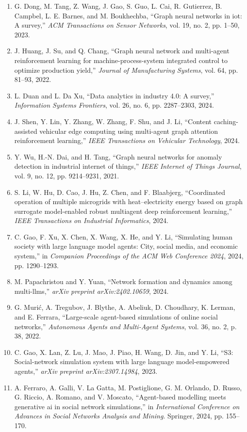 \documentclass[10pt,UTF8,fontset=fandol]{ctexart}
\begin{document}
\begin{enumerate}[leftmargin=2.4em,labelsep=0.4em,itemsep=0.15em]
\item G. Dong, M. Tang, Z. Wang, J. Gao, S. Guo, L. Cai, R. Gutierrez, B. Campbel, L. E. Barnes, and M. Boukhechba, ``Graph neural networks in iot: A survey,'' \textit{ACM Transactions on Sensor Networks}, vol. 19, no. 2, pp. 1--50, 2023.
\item J. Huang, J. Su, and Q. Chang, ``Graph neural network and multi-agent reinforcement learning for machine-process-system integrated control to optimize production yield,'' \textit{Journal of Manufacturing Systems}, vol. 64, pp. 81--93, 2022.
\item L. Duan and L. Da Xu, ``Data analytics in industry 4.0: A survey,'' \textit{Information Systems Frontiers}, vol. 26, no. 6, pp. 2287--2303, 2024.
\item J. Shen, Y. Lin, Y. Zhang, W. Zhang, F. Shu, and J. Li, ``Content caching-assisted vehicular edge computing using multi-agent graph attention reinforcement learning,'' \textit{IEEE Transactions on Vehicular Technology}, 2024.
\item Y. Wu, H.-N. Dai, and H. Tang, ``Graph neural networks for anomaly detection in industrial internet of things,'' \textit{IEEE Internet of Things Journal}, vol. 9, no. 12, pp. 9214--9231, 2021.
\item S. Li, W. Hu, D. Cao, J. Hu, Z. Chen, and F. Blaabjerg, ``Coordinated operation of multiple microgrids with heat--electricity energy based on graph surrogate model-enabled robust multiagent deep reinforcement learning,'' \textit{IEEE Transactions on Industrial Informatics}, 2024.
\item C. Gao, F. Xu, X. Chen, X. Wang, X. He, and Y. Li, ``Simulating human society with large language model agents: City, social media, and economic system,'' in \textit{Companion Proceedings of the ACM Web Conference 2024}, 2024, pp. 1290--1293.
\item M. Papachristou and Y. Yuan, ``Network formation and dynamics among multi-llms,'' \textit{arXiv preprint arXiv:2402.10659}, 2024.
\item G. Murić, A. Tregubov, J. Blythe, A. Abeliuk, D. Choudhary, K. Lerman, and E. Ferrara, ``Large-scale agent-based simulations of online social networks,'' \textit{Autonomous Agents and Multi-Agent Systems}, vol. 36, no. 2, p. 38, 2022.
\item C. Gao, X. Lan, Z. Lu, J. Mao, J. Piao, H. Wang, D. Jin, and Y. Li, ``S3: Social-network simulation system with large language model-empowered agents,'' \textit{arXiv preprint arXiv:2307.14984}, 2023.
\item A. Ferraro, A. Galli, V. La Gatta, M. Postiglione, G. M. Orlando, D. Russo, G. Riccio, A. Romano, and V. Moscato, ``Agent-based modelling meets generative ai in social network simulations,'' in \textit{International Conference on Advances in Social Networks Analysis and Mining}. Springer, 2024, pp. 155--170.

\end{enumerate}
\end{document}
